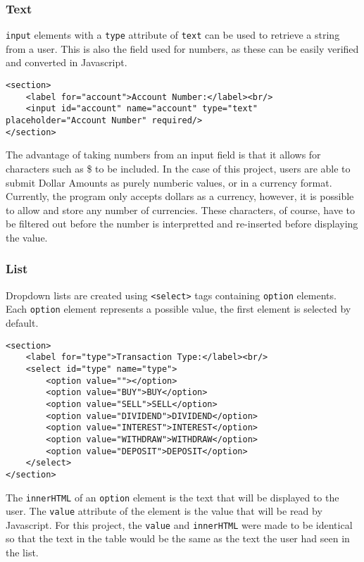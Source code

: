 \documentclass[letterpaper]{article}
\begin{document}
\subsubsection{Text}

\lstinline{input} elements with a \lstinline{type} attribute of \lstinline{text} can be used to retrieve a string from a user.
This is also the field used for numbers, as these can be easily verified and converted in Javascript.

\begin{lstlisting}[firstnumber=16]
<section>
    <label for="account">Account Number:</label><br/>
    <input id="account" name="account" type="text" placeholder="Account Number" required/>
</section>
\end{lstlisting}

The advantage of taking numbers from an input field is that it allows for characters such as \$ to be included.
In the case of this project, users are able to submit Dollar Amounts as purely numberic values, or in a currency format.
Currently, the program only accepts dollars as a currency, however, it is possible to allow and store any number of currencies.
These characters, of course, have to be filtered out before the number is interpretted and re-inserted before displaying the value.

\subsubsection{List}

Dropdown lists are created using \lstinline{<select>} tags containing \lstinline{option} elements.
Each \lstinline{option} element represents a possible value, the first element is selected by default.

\begin{lstlisting}[firstnumber=21]
<section>
    <label for="type">Transaction Type:</label><br/>
    <select id="type" name="type">
        <option value=""></option>
        <option value="BUY">BUY</option>
        <option value="SELL">SELL</option>
        <option value="DIVIDEND">DIVIDEND</option>
        <option value="INTEREST">INTEREST</option>
        <option value="WITHDRAW">WITHDRAW</option>
        <option value="DEPOSIT">DEPOSIT</option>
    </select>
</section>
\end{lstlisting}

The \lstinline{innerHTML} of an \lstinline{option} element is the text that will be displayed to the user.
The \lstinline{value} attribute of the element is the value that will be read by Javascript.
For this project, the \lstinline{value} and \lstinline{innerHTML} were made to be identical so that the text in the table would be the same as the text the user had seen in the list.
\end{document}

